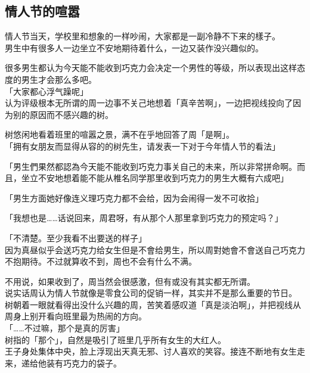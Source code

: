 \subsection{情人节的喧嚣}

情人节当天，学校里和想象的一样吵闹，大家都是一副冷静不下来的樣子。\\

男生中有很多人一边坐立不安地期待着什么，一边又装作没兴趣似的。

很多男生都认为今天能不能收到巧克力会决定一个男性的等级，所以表现出这样态度的男生才会那么多吧。\\

「大家都心浮气躁呢」\\

认为评级根本无所谓的周一边事不关己地想着「真辛苦啊」，一边把视线投向了因为别的原因而不感兴趣的树。

树悠闲地看着班里的喧嚣之景，满不在乎地回答了周「是啊」。\\

「拥有女朋友而显得从容的的树先生，请发表一下对于今年情人节的看法」

「男生們果然都認為今天能不能收到巧克力事关自己的未来，所以非常拼命啊。而且，坐立不安地想着能不能从椎名同学那里收到巧克力的男生大概有六成吧」

「男生方面她好像连义理巧克力都不会给，因为会闹得一发不可收拾」

「我想也是……话说回来，周君呀，有从那个人那里拿到巧克力的预定吗？」

「不清楚。至少我看不出要送的样子」\\

因为真昼似乎会送巧克力给女生但是不會给男生，所以周對她會不會送自己巧克力不抱期待。不过就算收不到，周也不会有什么不满。

不用说，如果收到了，周当然会很感激，但有或没有其实都无所谓。\\

说实话周认为情人节就像是零食公司的促销一样，其实并不是那么重要的节日。\\

树朝着一眼就看得出没什么兴趣的周，苦笑着感叹道「真是淡泊啊」，并把视线从周身上别开看向班里最为热闹的方向。\\

「……不过嘛，那个是真的厉害」\\

树指的「那个」，自然是吸引了班里几乎所有女生的大红人。\\

王子身处集体中央，脸上浮现出天真无邪、讨人喜欢的笑容。接连不断地有女生走来，递给他装有巧克力的袋子。

